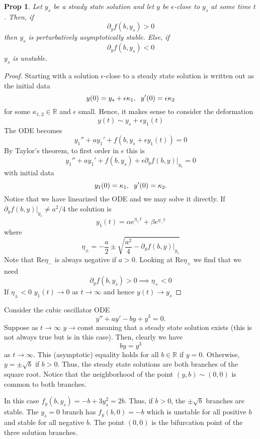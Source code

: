 \documentclass{article}
\newtheorem*{proposition}{Prop}
\theoremstyle{definition}
\theoremstyle{remark}
\theoremstyle{remark}
\begin{document}
\begin{proposition}
	Let $y_s$ be a steady state solution and let $y$ be $\epsilon$-close to $y_s$ at some time $t$. Then, if 
	$$
	\partial_y f(b, y_s)>0 
	$$
	then $y_s$ is \emph{perturbatively} asymptotically stable. Else, if
		$$
	\partial_y f(b, y_s)<0 
	$$
	$y_s$ is unstable. 
\end{proposition}
\begin{tcolorbox}[colback=red!5!white,colframe=red!75!black,title=Linearized stability]
	\begin{proof}
	Starting with a solution $\epsilon$-close to a steady state solution is written out as the initial data
	$$
y(0)=y_s+\epsilon \kappa_1,\hspace{2mm} y'(0) =  \epsilon \kappa_2
	$$
	for some $\kappa_{1,2}\in \mathbb{R}$ and $\epsilon$ small. Hence, it makes sense to consider the deformation
	$$
	y(t)\sim y_s+\epsilon y_1(t)
	$$
	The ODE becomes 
	$$
	y_1''+ay_1'+f(b, y_s+\epsilon y_1(t))=0
	$$ 
	By Taylor's theorem, to first order in $\epsilon$ this is
		$$
	y_1''+ay_1'+f(b,y_s)+\epsilon \partial_yf(b,y)|_{y_s}=0
	$$ 
	with initial data
	$$
y_1(0)= \kappa_1,\hspace{2mm}y'(0)=\kappa_2.
	$$
	Notice that we have linearized the ODE and we may solve it directly. If $\partial_y f(b,y)|_{y_s}\neq a^2/4$ the solution is
	$$
y_1(t)=\alpha e^{\eta_+t}+\beta e^{\eta_- t}
	$$
	where 
	$$
	\eta_\pm=-\frac{a}{2}\pm\sqrt{\frac{a^2}{4}-\partial_yf(b,y)|_{y_s}}
	$$
	Note that $\text{Re}\eta_-$ is always negative if $a>0$. Looking at $\text{Re}\eta_+$ we find that we need
	  $$
	\partial_y f(b, y_s)>0 \implies \eta_+<0
	$$
	If $\eta_{\pm}<0$ $y_1(t)\to 0$ as $t\to \infty$ and hence $y(t)\to y_s$
	
\end{proof}
\end{tcolorbox}

\begin{tcolorbox}[title=Example 1]
	Consider the cubic oscillator ODE
	$$
	y''+ay'-b y +y^3 = 0.
	$$
	Suppose as $t\to \infty$ $y\to\text{const}$ meaning that a steady state solution exists (this is not always true but is in this case). Then, clearly we have
	$$
	by  = y^3
	$$
	as $t\to \infty$. This (asymptotic) equality holds for all $b\in\mathbb{R}$ if $y=0$. Otherwise, $y=\pm\sqrt{b}$ if $b>0$. Thus, the steady state solutions are both branches of the square root. Notice that the neighborhood of the point $(y, b)\sim(0,0)$ is common to both branches.

	\vspace{2mm}

	In this case $f_y(b,y_s)=-b+3y_s^2=2b$. Thus, if $b>0$, the $\pm\sqrt{b}$ branches are stable. The $y_s=0$ branch has $f_y(b,0)=-b$ which is unstable for all positive $b$ and stable for all negative $b$. The point $(0,0)$ is the bifurcation point of the three solution branches.
\end{tcolorbox}
\end{document}
